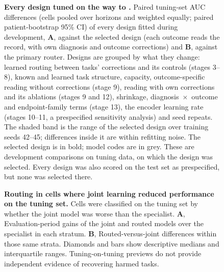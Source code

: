 \begin{figure}[p]
  \caption{\textbf{Every design tuned on the way to \opera{}.} Paired
  tuning-set AUC differences (cells pooled over horizons and weighted equally;
  paired patient-bootstrap 95\% CI) of every design fitted during development,
  \textbf{A}, against the selected design (each outcome reads the record, with
  own diagnosis and outcome corrections) and \textbf{B}, against the primary
  router. Designs are grouped by what they change: learned routing between
  tasks' corrections and its controls (stages 3--8), known and learned task
  structure, capacity, outcome-specific reading without corrections (stage 9),
  reading with own corrections and its ablations (stages 9 and 12), shrinkage,
  diagnosis~$\times$~outcome and endpoint-family terms (stage 13), the encoder
  learning rate (stages 10--11, a prespecified sensitivity analysis) and seed
  repeats. The shaded band is the range of the selected design over training
  seeds 42--45; differences inside it are within refitting noise. The selected
  design is in bold; model codes are in grey. These are development comparisons
  on tuning data, on which the design was selected. Every design was also scored
  on the test set as prespecified, but none was selected there.}
  \label{fig:supp-design-search}
\end{figure}

\begin{figure}[p]
  \caption{\textbf{Routing in cells where joint learning reduced performance
  on the tuning set.} Cells were classified on the tuning set by whether the joint model
  was worse than the specialist. \textbf{A}, Evaluation-period gains of the
  joint and routed models over the specialist in each stratum. \textbf{B},
  Routed-versus-joint differences within those same strata. Diamonds and bars
  show descriptive medians and interquartile ranges. Tuning-on-tuning previews
  do not provide independent evidence of recovering harmed tasks.}
  \label{fig:supp-rescue}
\end{figure}

